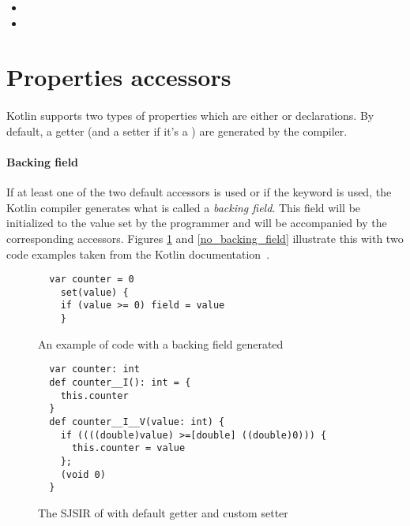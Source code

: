 \begin{itemize}
 \item {}
 \item {}
\end{itemize}

\section{Properties accessors} \label{accessor_gen}

\paragraph{} Kotlin supports two types of properties which are either  or 
 declarations. By default, a getter (and a setter if it's a ) are 
generated by the compiler. 

\paragraph{Backing field} If at least one of the two default accessors is used or if the 
 keyword  is used, the Kotlin compiler generates what is called a \textit{backing 
field}. This field will be initialized to the value set by the programmer and will be accompanied by 
the corresponding accessors. Figures \ref{with_backing_field} and \ref{no_backing_field} illustrate 
this with two code examples taken from the Kotlin documentation~\cite{kotlin_docs}.


\begin{figure}[h]
  \begin{verbatim}
  var counter = 0
    set(value) {
	if (value >= 0) field = value
    }
  \end{verbatim}
  \caption{An example of code with a backing field generated}
  \label{with_backing_field}
\end{figure}

\begin{figure}[h]
  \begin{verbatim}
  var counter: int
  def counter__I(): int = {
    this.counter
  }
  def counter__I__V(value: int) {
    if ((((double)value) >=[double] ((double)0))) {
      this.counter = value
    };
    (void 0)
  }
  \end{verbatim}
  \caption{The SJSIR of  with default getter and custom setter}
  \label{with_backing_field_ir}
\end{figure}


